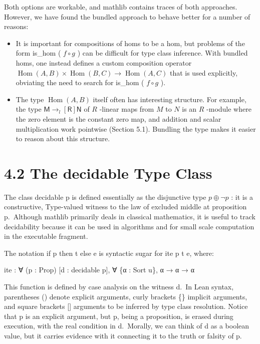 \documentclass[
]{article}
\newenvironment{Shaded}{}{}
\newcommand{\NormalTok}[1]{#1}
\providecommand{\tightlist}{%
  \setlength{\itemsep}{0pt}\setlength{\parskip}{0pt}}
\begin{document}
Both options are workable, and mathlib contains traces of both
approaches. However, we have found the bundled approach to behave better
for a number of reasons:

\begin{itemize}
\tightlist
\item
  It is important for compositions of homs to be a hom, but problems of
  the form is\_hom ( \(f \circ g\) ) can be difficult for type class
  inference. With bundled homs, one instead defines a custom composition
  operator
  \(\operatorname{Hom}(A, B) \times \operatorname{Hom}(B, C) \to \operatorname{Hom}(A, C)\)
  that is used explicitly, obviating the need to search for is\_hom (
  \(f \circ g\) ).\\
\item
  The type \(\operatorname{Hom}(A, B)\) itself often has interesting
  structure. For example, the type
  \(\mathsf{M} \to_{l}[\mathsf{R}] \mathsf{N}\) of \(R\) -linear maps
  from \(M\) to \(N\) is an \(R\) -module where the zero element is the
  constant zero map, and addition and scalar multiplication work
  pointwise (Section 5.1). Bundling the type makes it easier to reason
  about this structure.
\end{itemize}

\section{4.2 The decidable Type Class}\label{the-decidable-type-class}

The class decidable p is defined essentially as the disjunctive type
\(p \oplus \neg p\) : it is a constructive, Type-valued witness to the
law of excluded middle at proposition p.~Although mathlib primarily
deals in classical mathematics, it is useful to track decidability
because it can be used in algorithms and for small scale computation in
the executable fragment.

The notation if p then t else e is syntactic sugar for ite p t e, where:

\begin{Shaded}
\begin{Highlighting}[]
\NormalTok{ite : ∀ (p : Prop) [d : decidable p],}
\NormalTok{∀ \{α : Sort u\}, α → α → α }
\end{Highlighting}
\end{Shaded}

This function is defined by case analysis on the witness d.~In Lean
syntax, parentheses () denote explicit arguments, curly brackets \{\}
implicit arguments, and square brackets {[}{]} arguments to be inferred
by type class resolution. Notice that p is an explicit argument, but p,
being a proposition, is erased during execution, with the real condition
in d.~Morally, we can think of d as a boolean value, but it carries
evidence with it connecting it to the truth or falsity of p.
\end{document}
